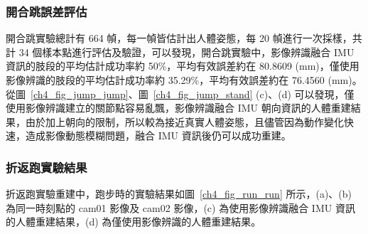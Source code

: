 \subsubsection*{開合跳誤差評估}
開合跳實驗總計有 664 幀，每一幀皆估計出人體姿態，每 20 幀進行一次採樣，共計 34 個樣本點進行評估及驗證，可以發現，開合跳實驗中，影像辨識融合 IMU 資訊的肢段的平均估計成功率約 50\%，平均有效誤差約在 80.8609 (mm)，僅使用影像辨識的肢段的平均估計成功率約 35.29\%，平均有效誤差約在 76.4560 (mm)。從圖~\ref{ch4_fig_jump_jump}、圖~\ref{ch4_fig_jump_stand} (c)、(d) 可以發現，僅使用影像辨識建立的關節點容易亂飄，影像辨識融合 IMU 朝向資訊的人體重建結果，由於加上朝向的限制，所以較為接近真實人體姿態，且儘管因為動作變化快速，造成影像動態模糊問題，融合 IMU 資訊後仍可以成功重建。

\clearpage

\subsubsection*{折返跑實驗結果}
折返跑實驗重建中，跑步時的實驗結果如圖~\ref{ch4_fig_run_run} 所示，(a)、(b) 為同一時刻點的 cam01 影像及 cam02 影像，(c) 為使用影像辨識融合 IMU 資訊的人體重建結果，(d) 為僅使用影像辨識的人體重建結果。

